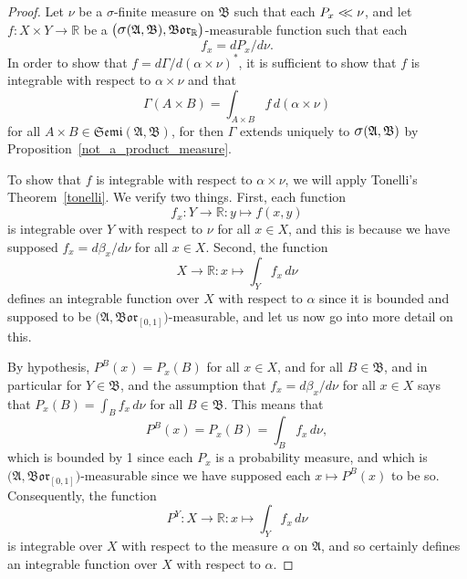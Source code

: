 \documentclass[
twoside=true,
paper=letter,
fontsize=11pt,
pagesize=auto,
leqno,
openany,
headsepline,
overfullrule,
]{scrbook}
\theoremstyle{plain}
\theoremstyle{plain}
\theoremstyle{definition}
\theoremstyle{bfnoteitalic}
\theoremstyle{bfnoteroman}
\newcommand{\sigalg}[1]{\mathfrak{#1}}
\newcommand{\borel}{\mathfrak{Bor}}
\newcommand{\sagb}{\mathop{\hbox{\large{$\sigma$}}}\nolimits}
\newcommand{\textsigma}{\hbox{\large{$\sigma$}}\kern-1pt}
\newcommand{\R}{\mathbb{R}}
\newcommand{\sigmaalgebra}{\sigalg{A}}
\newcommand{\sigmaalgebraii}{\sigalg{B}}
\newcommand{\productsemiring}[2]{\mathfrak{Semi}(#1,#2)}
\newcommand{\productsig}[2]{\sagb(#1,#2)}
\newcommand{\funcf}{f}
\newcommand{\function}{f}
\newcommand{\measurespace}{X}
\newcommand{\measurespaceii}{Y}
\newcommand{\abscont}{\mathrel{< \kern-3.5pt <}}
\newcommand{\measnu}{\nu}
\newcommand{\pspace}{\measurespace}%
\newcommand{\sspace}{\measurespaceii}%
\newcommand{\pspaceset}{A}
\newcommand{\sspaceset}{B}
\newcommand{\pspaceelt}{x}
\newcommand{\sspaceelt}{y}
\newcommand{\sspacesig}{\sigalg{B}}
\newcommand{\pspacesig}{\sigalg{A}}
\newcommand{\measonprod}{\Gamma}%
\newcommand{\marginalone}{\alpha}%
\newcommand{\marginaltwo}{\beta}%
\newcommand{\prior}{\marginalone}
\newcommand{\predictive}{\marginaltwo}
\begin{document}
\begin{proof}
Let $\measnu$ be a \textsigma\hyp{}finite measure on $\sigmaalgebraii$
such that each
$P_\pspaceelt\abscont \measnu$, and let
$\funcf : \pspace\times\sspace\to\R$ be a
$\bigl(\productsig{\pspacesig}{\sspacesig},\borel_\R\bigr)$\hyp{}measurable function
such that each
\[
\function_\pspaceelt
=
d P_\pspaceelt/d\measnu.
\]
In order to show that
$\funcf
=
d\measonprod/d(\prior \times\measnu)^*$,
it is sufficient to show that
$\funcf$
is integrable with respect to
$\prior\times\measnu$
and that
\[
\measonprod(\pspaceset\times\sspaceset)
=
\int_{\pspaceset\times\sspaceset}
\function \, d(\prior\times\measnu)
\]
for all
$\pspaceset\times\sspaceset
\in\productsemiring{\pspacesig}{\sspacesig}$,
for then $\measonprod$ extends uniquely to
$\productsig{\pspacesig}{\sspacesig}$
by Proposition~\ref{not_a_product_measure}.

To show that $\function$ is integrable with respect to
$\prior\times\measnu$, we will apply Tonelli's Theorem~\ref{tonelli}.
We verify two things. First, each function
\[
\function_\pspaceelt:\sspace\to\R
:\sspaceelt\mapsto \function(\pspaceelt,\sspaceelt)
\]
is integrable over
$\sspace$ with respect to $\measnu$ for all
$\pspaceelt\in\pspace$,
and this is because  we have supposed
$\function_\pspaceelt
=
d\predictive_\pspaceelt/d\measnu$
for all $\pspaceelt\in\pspace$. Second, the function
\[
\pspace\to\R:
\pspaceelt\mapsto \int_\sspace\function_\pspaceelt\, d\measnu
\]
defines an integrable function over $\pspace$ with respect to $\prior$ since it is bounded and supposed to be
$\bigl(\sigmaalgebra, \borel_{[0,1]}\bigr)$\hyp{}measurable, and let us now go into more detail on this.

By hypothesis,
$P^\sspaceset(\pspaceelt)
= P_\pspaceelt(\sspaceset)$
for all
$\pspaceelt\in\pspace$, and
for all $\sspaceset\in\sspacesig$, and in particular for
$\sspace\in\sspacesig$, and  the assumption that
$\funcf_\pspaceelt
=
d\predictive_\pspaceelt/d\measnu$
for all $\pspaceelt\in\pspace$ says that
$P_\pspaceelt(\sspaceset)
= \int_\sspaceset\function_\pspaceelt\,d\measnu$
for all $\sspaceset\in\sspacesig$.
This means  that
\[
P^\sspaceset(\pspaceelt)
= P_\pspaceelt(\sspaceset)
=
\int_\sspaceset\function_\pspaceelt\,d\measnu,
\]
which is bounded by 1 since each $P_\pspaceelt$ is a probability measure, and which is
$\bigl(\sigmaalgebra, \borel_{[0,1]}\bigr)$\hyp{}measurable since we have supposed each
$\pspaceelt\mapsto P^\sspaceset(\pspaceelt)$ to be so.
Consequently, the function
\[
P^\sspace : \pspace\to\R:
\pspaceelt \mapsto
\int_\sspace \funcf_\pspaceelt\,d\measnu
\]
is integrable over $\pspace$ with respect to the measure $\prior$ on
$\pspacesig$, and so certainly defines an integrable function over
$\pspace$ with respect to  $\prior$.


\end{proof}
\end{document}
